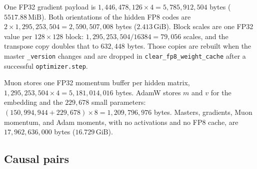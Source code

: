 \documentclass[11pt]{article}
\DeclareRobustCommand{\code}[1]{\texttt{#1}}
\newcommand{\MiB}{\,\mathrm{MiB}}
\newcommand{\GiB}{\,\mathrm{GiB}}
\begin{document}
One FP32 gradient payload is \(1{,}446{,}478{,}126\times 4=5{,}785{,}912{,}504\)
bytes (\(5517.88\MiB\)). Both orientations of the hidden FP8 codes are
\(2\times 1{,}295{,}253{,}504=2{,}590{,}507{,}008\) bytes (\(2.413\GiB\)).
Block scales are one FP32 value per \(128\times 128\) block:
\(1{,}295{,}253{,}504/16384=79{,}056\) scales, and the transpose copy doubles
that to \(632{,}448\) bytes. Those copies are rebuilt when the master
\code{\_version} changes and are dropped in \code{clear\_fp8\_weight\_cache}
after a successful \code{optimizer.step}.

Muon stores one FP32 momentum buffer per hidden matrix,
\(1{,}295{,}253{,}504\times 4=5{,}181{,}014{,}016\) bytes. AdamW stores
\(m\) and \(v\) for the embedding and the \(229{,}678\) small parameters:
\((150{,}994{,}944+229{,}678)\times 8=1{,}209{,}796{,}976\) bytes. Masters,
gradients, Muon momentum, and Adam moments, with no activations and no FP8
cache, are \(17{,}962{,}636{,}000\) bytes (\(16.729\GiB\)).

\subsection{Causal pairs}
\end{document}
